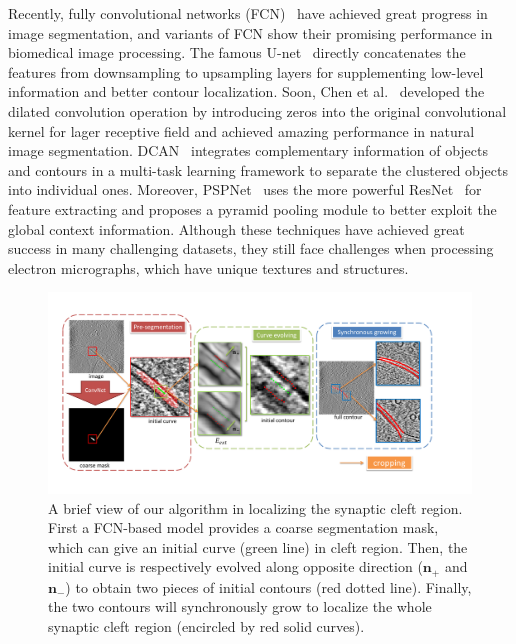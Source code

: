 Recently, fully convolutional networks (FCN)~\cite{Long2015,Ronneberger2015,Chen2016a,Chen2017,Zhao2016} have achieved great progress in image segmentation, and variants of FCN \cite{Ronneberger2015,Chen2017,Dhungel2015,Lieman-Sifry2017,Chen2016b,Ourselin} show their promising performance in biomedical image processing.
%
The famous U-net~\cite{Ronneberger2015} directly concatenates the features from downsampling to upsampling layers for supplementing low-level information and better contour localization.
Soon, Chen et al.~\cite{Chen2016a} developed the dilated convolution operation by introducing zeros into the original convolutional kernel for lager receptive field and achieved amazing performance in natural image segmentation.
DCAN~\cite{Chen2017} integrates complementary information of objects and contours in a multi-task learning framework to separate the clustered objects into individual ones.
Moreover, PSPNet~\cite{Zhao2016} uses the more powerful ResNet~\cite{He2016} for feature extracting and proposes a pyramid pooling module to better exploit the global context information.
%
Although these techniques have achieved great success in many challenging datasets, they still face challenges when processing electron micrographs, which have unique textures and structures.

\begin{figure}[t]
    \begin{center}
        \includegraphics[width=7in]{figs/FigCG.pdf}
   \end{center}
\caption{A brief view of our algorithm in localizing the synaptic cleft region. First a FCN-based model provides a coarse segmentation mask, which can give an initial curve (green line) in cleft region.
        Then, the initial curve is respectively evolved along opposite direction ($\mathbf{n}_+$ and $\mathbf{n}_-$) to obtain two pieces of initial contours (red dotted line).
        Finally, the two contours will synchronously grow to localize the whole synaptic cleft region (encircled by red solid curves).}
\label{fig:cg}
\end{figure}


